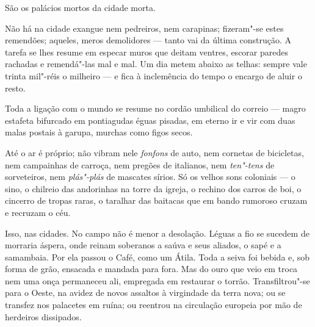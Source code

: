 São os palácios mortos da cidade morta.


Não há na cidade exangue nem pedreiros, nem carapinas; fizeram"-se estes
remendões; aqueles, meros demolidores --- tanto vai da última
construção. A tarefa se lhes resume em especar muros que deitam ventres,
escorar paredes rachadas e remendá"-las mal e mal. Um dia metem abaixo as
telhas: sempre vale trinta mil"-réis o milheiro --- e fica à inclemência
do tempo o encargo de aluir o resto.



Toda a ligação com o mundo se resume no cordão umbilical do correio ---
magro estafeta bifurcado em pontiagudas éguas pisadas, em eterno ir e
vir com duas malas postais à garupa, murchas como figos secos.

Até o ar é próprio; não vibram nele \emph{fonfons} de auto, nem cornetas
de bicicletas, nem campainhas de carroça, nem pregões de italianos, nem
\emph{ten"-tens} de sorveteiros, nem \emph{plás"-plás} de mascates sírios.
Só os velhos sons coloniais --- o sino, o chilreio das andorinhas na
torre da igreja, o rechino dos carros de boi, o cincerro de tropas
raras, o taralhar das baitacas que em bando rumoroso cruzam e recruzam o
céu.

Isso, nas cidades. No campo não é menor a desolação. Léguas a fio se
sucedem de morraria áspera, onde reinam soberanos a saúva e seus
aliados, o sapé e a samambaia. Por ela passou o Café, como um Átila.
Toda a seiva foi bebida e, sob forma de grão, ensacada e mandada para
fora. Mas do ouro que veio em troca nem uma onça permaneceu ali,
empregada em restaurar o torrão. Transfiltrou"-se para o Oeste, na avidez
de novos assaltos à virgindade da terra nova; ou se transfez nos
palacetes em ruína; ou reentrou na circulação europeia por mão de
herdeiros dissipados.

